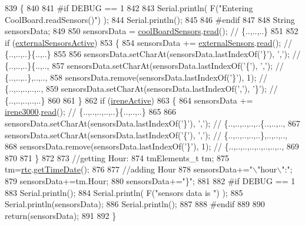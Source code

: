 \begin{DoxyCode}
839 \{
840 
841 \textcolor{preprocessor}{#if DEBUG == 1}
842 
843     Serial.println( F(\textcolor{stringliteral}{"Entering CoolBoard.readSensors()"}) );
844     Serial.println();
845 
846 \textcolor{preprocessor}{#endif}
847 
848     String sensorsData;
849 
850     sensorsData = \hyperlink{classCoolBoard_af102be5288bd7f7a8e59b13f86e26a00}{coolBoardSensors}.\hyperlink{classCoolBoardSensors_a91badb2539d91fda8679f2a597874c48}{read}(); \textcolor{comment}{// \{..,..,..\}}
851     
852     \textcolor{keywordflow}{if} (\hyperlink{classCoolBoard_a638b00b76aeb819ecfd4c10b8cdd7bb7}{externalSensorsActive})
853     \{
854         sensorsData += \hyperlink{classCoolBoard_a09e26264839c65873eb56af476eff6b2}{externalSensors}.\hyperlink{classExternalSensors_a53177b81eca3be89508b5511ddcd00fc}{read}(); \textcolor{comment}{// \{..,..,..\}\{..,..\}}
855 
856         sensorsData.setCharAt(sensorsData.lastIndexOf(\textcolor{charliteral}{'\}'}), \textcolor{charliteral}{','}); \textcolor{comment}{// \{..,..,..\}\{..,..,}
857         sensorsData.setCharAt(sensorsData.lastIndexOf(\textcolor{charliteral}{'\{'}), \textcolor{charliteral}{','}); \textcolor{comment}{// \{..,..,..\},..,..,}
858         sensorsData.remove(sensorsData.lastIndexOf(\textcolor{charliteral}{'\}'}), 1); \textcolor{comment}{// \{..,..,..,..,..,}
859         sensorsData.setCharAt(sensorsData.lastIndexOf(\textcolor{charliteral}{','}), \textcolor{charliteral}{'\}'}); \textcolor{comment}{// \{..,..,..,..,..\}}
860 
861     \}
862     \textcolor{keywordflow}{if} (\hyperlink{classCoolBoard_a9c3f7ac625481ee2ae802a25d97a4ae0}{ireneActive})
863     \{
864         sensorsData += \hyperlink{classCoolBoard_ad103718ce316006c4695b8eb312eaf11}{irene3000}.\hyperlink{classIrene3000_a852a170feea994ea1df01c6b245b5d9a}{read}(); \textcolor{comment}{// \{..,..,..,..,..\}\{..,..,..\}}
865 
866         sensorsData.setCharAt(sensorsData.lastIndexOf(\textcolor{charliteral}{'\}'}), \textcolor{charliteral}{','}); \textcolor{comment}{// \{..,..,..,..,..\{..,..,..,}
867         sensorsData.setCharAt(sensorsData.lastIndexOf(\textcolor{charliteral}{'\{'}), \textcolor{charliteral}{','}); \textcolor{comment}{// \{..,..,..,..,..\},..,..,..,}
868         sensorsData.remove(sensorsData.lastIndexOf(\textcolor{charliteral}{'\}'}), 1); \textcolor{comment}{// \{..,..,..,..,..,..,..,..,}
869         
870         
871     \}
872 
873     \textcolor{comment}{//getting Hour:}
874     tmElements\_t tm;
875     tm=\hyperlink{classCoolBoard_a50d2a6716879d64a85f3c6b44ad63275}{rtc}.\hyperlink{classCoolTime_a7a7501c5ca77dd1248bea704c44f986c}{getTimeDate}();
876     
877     \textcolor{comment}{//adding Hour}
878     sensorsData+=\textcolor{stringliteral}{"\(\backslash\)"hour\(\backslash\)":"};   
879     sensorsData+=tm.Hour;
880     sensorsData+=\textcolor{stringliteral}{"\}"};
881     
882 \textcolor{preprocessor}{#if DEBUG == 1}
883     Serial.println();
884     Serial.println( F(\textcolor{stringliteral}{"sensors data is "}) );
885     Serial.println(sensorsData);
886     Serial.println();
887 
888 \textcolor{preprocessor}{#endif}
889 
890     \textcolor{keywordflow}{return}(sensorsData);
891 
892 \}
\end{DoxyCode}
